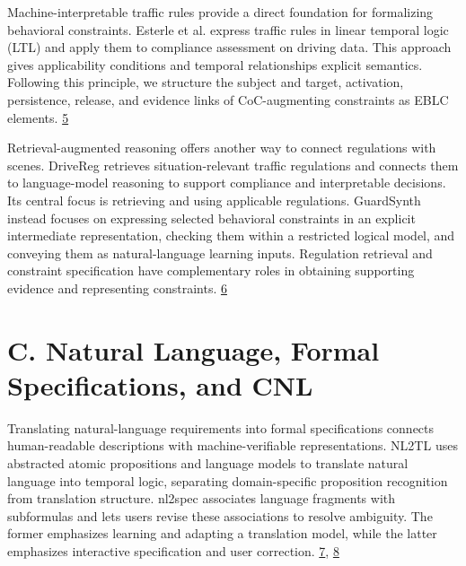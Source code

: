 \documentclass[11pt,a4paper]{article}
\begin{document}
Machine-interpretable traffic rules provide a direct foundation for formalizing behavioral constraints. Esterle et al. express traffic rules in linear temporal logic (LTL) and apply them to compliance assessment on driving data. This approach gives applicability conditions and temporal relationships explicit semantics. Following this principle, we structure the subject and target, activation, persistence, release, and evidence links of CoC-augmenting constraints as EBLC elements. \href{\detokenize{https://arxiv.org/abs/2007.00330}}{5}\par

Retrieval-augmented reasoning offers another way to connect regulations with scenes. DriveReg retrieves situation-relevant traffic regulations and connects them to language-model reasoning to support compliance and interpretable decisions. Its central focus is retrieving and using applicable regulations. GuardSynth instead focuses on expressing selected behavioral constraints in an explicit intermediate representation, checking them within a restricted logical model, and conveying them as natural-language learning inputs. Regulation retrieval and constraint specification have complementary roles in obtaining supporting evidence and representing constraints. \href{\detokenize{https://ojs.aaai.org/index.php/AAAI/article/view/41168}}{6}\par

\section*{C. Natural Language, Formal Specifications, and CNL}

Translating natural-language requirements into formal specifications connects human-readable descriptions with machine-verifiable representations. NL2TL uses abstracted atomic propositions and language models to translate natural language into temporal logic, separating domain-specific proposition recognition from translation structure. nl2spec associates language fragments with subformulas and lets users revise these associations to resolve ambiguity. The former emphasizes learning and adapting a translation model, while the latter emphasizes interactive specification and user correction. \href{\detokenize{https://aclanthology.org/2023.emnlp-main.985/}}{7}, \href{\detokenize{https://arxiv.org/abs/2303.04864}}{8}\par
\end{document}
